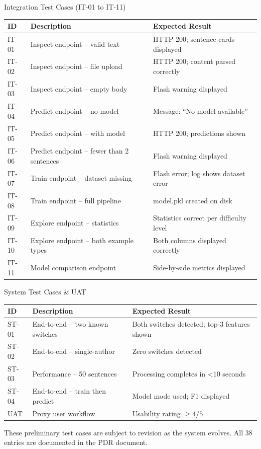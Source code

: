 \documentclass[compress,aspectratio=169]{beamer}
\begin{document}
\begin{frame}{Integration Test Cases (IT-01 to IT-11)}
\centering
\footnotesize
\begin{tabularx}{\textwidth}{p{1.2cm} X X}
\toprule
\textbf{ID} & \textbf{Description} & \textbf{Expected Result}\\
\midrule
IT-01 & Inspect endpoint – valid text & HTTP 200; sentence cards displayed\\
IT-02 & Inspect endpoint – file upload & HTTP 200; content parsed correctly\\
IT-03 & Inspect endpoint – empty body & Flash warning displayed\\
IT-04 & Predict endpoint – no model & Message: ``No model available''\\
IT-05 & Predict endpoint – with model & HTTP 200; predictions shown\\
IT-06 & Predict endpoint – fewer than 2 sentences & Flash warning displayed\\
IT-07 & Train endpoint – dataset missing & Flash error; log shows dataset error\\
IT-08 & Train endpoint – full pipeline & model.pkl created on disk\\
IT-09 & Explore endpoint – statistics & Statistics correct per difficulty level\\
IT-10 & Explore endpoint – both example types & Both columns displayed correctly\\
IT-11 & Model comparison endpoint & Side-by-side metrics displayed\\
\bottomrule
\end{tabularx}
\end{frame}

\begin{frame}{System Test Cases \& UAT}
\centering
\footnotesize
\begin{tabularx}{\textwidth}{p{1.2cm} X X}
\toprule
\textbf{ID} & \textbf{Description} & \textbf{Expected Result}\\
\midrule
ST-01 & End-to-end – two known switches & Both switches detected; top-3 features shown\\
ST-02 & End-to-end – single-author & Zero switches detected\\
ST-03 & Performance – 50 sentences & Processing completes in <10 seconds\\
ST-04 & End-to-end – train then predict & Model mode used; F1 displayed\\
\midrule
UAT & Proxy user workflow & Usability rating $\ge 4/5$\\
\bottomrule
\end{tabularx}
\vspace{0.3cm}
\raggedright\tiny
These preliminary test cases are subject to revision as the system evolves. All 38 entries are documented in the PDR document.
\end{frame}
\end{document}
